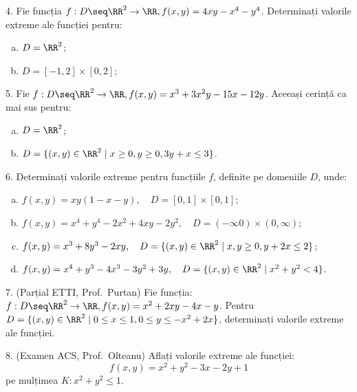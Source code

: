 \vspace{0.3cm}

4. Fie funcția $ f : D \seq \RR^2 \to \RR, f(x, y) = 4xy - x^4 - y^4 $.
Determinați valorile extreme ale funcției pentru:
\begin{enumerate}[(a)]
\item $ D = \RR^2 $;
\item $ D = [ -1, 2 ] \times [0, 2] $;
\end{enumerate}

\vspace{0.3cm}

5. Fie $ f : D \seq \RR^2 \to \RR, f(x, y) = x^3 + 3x^2y - 15x - 12y $.
Aceeași cerință ca mai sus pentru:
\begin{enumerate}[(a)]
\item $ D = \RR^2 $;
\item $ D = \{ (x, y) \in \RR^2 \mid x \geq 0, y \geq 0, 3y + x \leq 3 \} $.
\end{enumerate}

\vspace{0.3cm}

6. Determinați valorile extreme pentru funcțiile $ f $, definite pe
domeniile $ D $, unde:
\begin{enumerate}[(a)]
\item $ f(x, y) = xy(1 - x - y), \quad D = [0, 1] \times [0, 1] $;
\item $ f(x, y) = x^4 + y^4 - 2x^2 + 4xy - 2y^2, \quad D = (-\infty 0) \times (0, \infty) $;
\item $ f(x, y) = x^3 + 8y^3 - 2xy, \quad D = \{ (x, y) \in \RR^2 \mid x, y \geq 0, y + 2x \leq 2 \} $;
\item $ f(x, y) = x^4 + y^3 - 4x^3 - 3y^2 + 3y, \quad D = \{ (x, y) \in \RR^2 \mid x^2 + y^2 < 4 \} $.
\end{enumerate}

\vspace{0.3cm}

7. (Parțial ETTI, Prof.\ Purtan) Fie funcția: $ f : D \seq \RR^2 \to \RR, f(x, y) = x^2 + 2xy - 4x - y $.
Pentru $ D = \{ (x, y) \in \RR^2 \mid 0 \leq x \leq 1, 0 \leq y \leq -x^2 + 2x \} $,
determinați valorile extreme ale funcției.

\vspace{0.3cm}

8. (Examen ACS, Prof.\ Olteanu) Aflați valorile extreme ale funcției:
\[
  f(x, y) = x^2 + y^2 - 3x - 2y + 1
\]
pe mulțimea $ K : x^2 + y^2 \leq 1 $.

\vspace{0.3cm}

